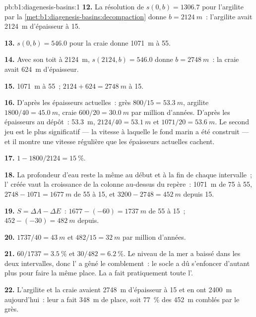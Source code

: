\begin{solution}{pb:b1:diagenesis-basins:1}
\textbf{12.} La résolution de $s(0, b) = 1306.7$ pour l'argilite par la
\cref{met:b1:diagenesis-basins:decompaction} donne $b = \qty{2124}{m}$~: l'argilite
avait \qty{2124}{m} d'épaisseur à \qty{15}{\Ma}.

\textbf{13.} $s(0, b) = 546.0$ pour la craie donne \qty{1071}{m} à
\qty{55}{\Ma}.

\textbf{14.} Avec son toit à \qty{2124}{m}, $s(2124, b) = 546.0$ donne $b =
\qty{2748}{m}$~: la craie avait \qty{624}{m} d'épaisseur.

\textbf{15.} \qty{1071}{m} à \qty{55}{\Ma}~; $2124 + 624 = \qty{2748}{m}$ à
\qty{15}{\Ma}.

\textbf{16.} D'après les épaisseurs actuelles~: grès $800/15 = \qty{53.3}{m}$,
argilite $1800/40 = \qty{45.0}{m}$, craie $600/20 = \qty{30.0}{m}$ par million
d'années. D'après les épaisseurs au dépôt~: \qty{53.3}{m}, $2124/40 =
\qty{53.1}{m}$ et $1071/20 = \qty{53.6}{m}$. Le second jeu est le plus significatif
--- la vitesse à laquelle le fond marin a été construit --- et il montre une vitesse
régulière que les épaisseurs actuelles cachent.

\textbf{17.} $1 - 1800/2124 = \qty{15}{\%}$.

\textbf{18.} La profondeur d'eau reste la même au début et à la fin de chaque
intervalle~; l' créée vaut la croissance de la colonne au-dessus du
repère~: \qty{1071}{m} de 75 à \qty{55}{\Ma}, $2748 - 1071 = \qty{1677}{m}$ de
55 à \qty{15}{\Ma}, et $3200 - 2748 = \qty{452}{m}$ depuis \qty{15}{\Ma}.

\textbf{19.} $S = \Delta A - \Delta E$~: $1677 - (-60) = \qty{1737}{m}$ de 55 à
\qty{15}{\Ma}~; $452 - (-30) = \qty{482}{m}$ depuis.

\textbf{20.} $1737/40 = \qty{43}{m}$ et $482/15 = \qty{32}{m}$ par million
d'années.

\textbf{21.} $60/1737 = \qty{3.5}{\%}$ et $30/482 = \qty{6.2}{\%}$. Le niveau de la mer a baissé
dans les deux intervalles, donc l' a gêné le comblement~: le socle a dû s'enfoncer
d'autant plus pour faire la même place. La  a fait pratiquement toute
l'.

\textbf{22.} L'argilite et la craie avaient \qty{2748}{m} d'épaisseur à \qty{15}{\Ma}
et en ont \qty{2400}{m} aujourd'hui~: leur  a fait \qty{348}{m} de place,
soit \qty{77}{\%} des \qty{452}{m} comblés par le grès.


\end{solution}
